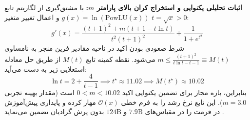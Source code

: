 \textbf{اثبات تحلیلی یکنوایی و استخراج کران بالای پارامتر $m$:}
با مشتق‌گیری از لگاریتم تابع $g(x) = \ln(\text{PowLU}(x))$ و اعمال تغییر متغیر $t = \sqrt{x} > 0$:
\begin{equation}
    g'(x) = \frac{(t+1)^2 + m(t + 1 - t \ln t)}{t^2(t+1)^2} + \frac{1}{1 + e^{t^2}}
\end{equation}
شرط صعودی بودن اکید در ناحیه مقادیر فرین منجر به نامساوی $m \le \frac{(t+1)^2}{t \ln t - t - 1} \equiv M(t)$ می‌شود. نقطه کمینه تابع $M(t)$ از طریق حل معادله استعلایی زیر به دست می‌آید:
\begin{equation}
    \ln t = 2 + \frac{4}{t-1} \implies t^\star \approx 11.02 \implies M(t^\star) \approx 10.02
\end{equation}
بنابراین، بازه مجاز برای تضمین یکنوایی اکید $0 < m < 10.02$ است (مقدار بهینه تجربی $m=3.0$). این تابع نرخ رشد را به فرم خطی $\mathcal{O}(x)$ مهار کرده و پایداری پیش‌آموزش در فرمت  را در مقیاس‌های $7.9\text{B}$ و $124\text{B}$ بدون پرش گرادیان تضمین می‌نماید \cite{jiang2026powlu}.


